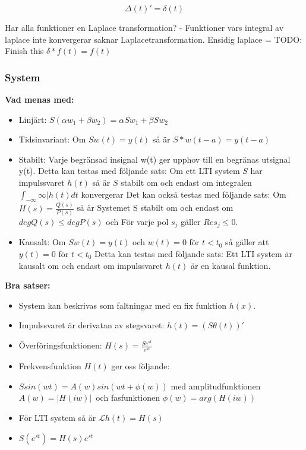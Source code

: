 \documentclass[twocolumn,a4paper]{article}
\begin{document}
\begin{equation}
    \Delta(t)' = \delta(t)
\end{equation}

Har alla funktioner en Laplace transformation? - Funktioner vars integral av laplace inte konvergerar saknar Laplacetransformation.
Ensidig laplace = TODO: Finish this
\newline
\newline
$\delta \ast f(t) = f(t)$


\subsubsection*{System}
\textbf{Vad menas med:} 
\begin{itemize}
    \item Linjärt: $S(\alpha w_1 + \beta w_2) = \alpha S w_1 + \beta S w_2$
    \item Tidsinvariant: Om $S w(t) = y(t)$ så är $S*w(t-a) = y(t-a)$
    \item Stabilt: Varje begränsad insignal w(t) ger upphov till en begränas utsignal y(t). 
    \newline
    Detta kan testas med följande sats: \newline
    Om ett LTI system $S$ har impulssvaret $h(t)$ så är $S$ stabilt om och endast om integralen $\int_{-\infty}{\infty} |h(t) dt$ konvergerar
    Det kan också testas med följande sats: \newline
    Om $H(s) = \frac{Q(s)}{P(s)}$ så är Systemet S stabilt om och endast om $deg Q(s) \leq deg P(s)$ och För varje pol $s_j$ gäller $Re s_j \le 0$.
    \item  Kausalt: Om $S w(t) = y(t)$ och $w(t) = 0$ för $t < t_0$ så gäller att $y(t) = 0$ för $ t < t_0$ 
    \newline
    Detta kan testas med följande sats: \newline
    Ett LTI system är kausalt om och endast om impulssvaret $h(t)$ är en kausal funktion. 
\end{itemize}

\textbf{Bra satser:}\newline
\begin{itemize}
    \item System kan beskrivas som faltningar med en fix funktion $h(x)$. 
    \item Impulssvaret är derivatan av stegsvaret: $h(t) = (S\theta(t))'$
    \item Överföringsfunktionen: $H(s) = \frac{Se^{st}}{e^{st}}$
    \item Frekvensfunktion $H(t)$ ger oss följande:
    \item $S sin(w t) = A(w) sin(wt+ \phi(w))$ med amplitudfunktionen $A(w) = |H(iw)|$ och fasfunktionen $\phi(w) = arg(H(iw))$
    \item För LTI system så är $\mathcal{L} h(t) = H(s)$
    \item $S(e^{st}) = H(s)e^{st}$

\end{itemize}
\end{document}
